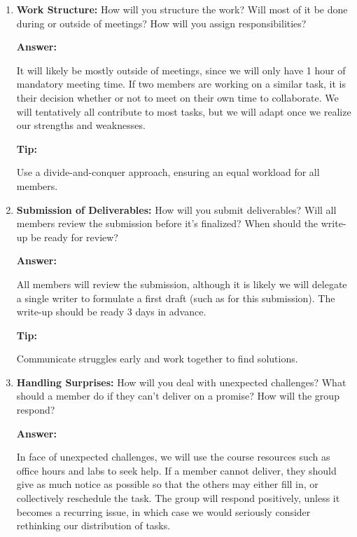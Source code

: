 \documentclass[12pt]{article}
\newenvironment{answer}[1][]{
  \color{blue}\textbf{Answer:}
}{}
\newenvironment{alice}[1][]{
  \color{black}\textbf{Tip:}
}{}
\begin{document}
\begin{enumerate}
\begin{alice}

Structure meetings effectively and decide on a method for resolving disagreements, such as consensus or majority vote.
\end{alice}

\item {\bf Work Structure:} How will you structure the work? Will most of it be done during or outside of meetings? How will you assign responsibilities?

\begin{answer}
  It will likely be mostly outside of meetings, since we will only have 1 hour of mandatory meeting time. If two members are working on a similar task, it is their decision whether or not to meet on their own time to collaborate. We will tentatively all contribute to most tasks, but we will adapt once we realize our strengths and weaknesses.
\end{answer}

\begin{alice}

Use a divide-and-conquer approach, ensuring an equal workload for all members.
\end{alice}

\item {\bf Submission of Deliverables:} How will you submit deliverables? Will all members review the submission before it’s finalized? When should the write-up be ready for review?

\begin{answer}

All members will review the submission, although it is likely we will delegate a single writer to formulate a first draft (such as for this submission). The write-up should be ready 3 days in advance.
\end{answer}

\begin{alice}

Communicate struggles early and work together to find solutions.
\end{alice}

\item {\bf Handling Surprises:} How will you deal with unexpected challenges? What should a member do if they can’t deliver on a promise? How will the group respond?

\begin{answer}
  In face of unexpected challenges, we will use the course resources such as office hours and labs to seek help. If a member cannot deliver, they should give as much notice as possible so that the others may either fill in, or collectively reschedule the task. The group will respond positively, unless it becomes a recurring issue, in which case we would seriously consider rethinking our distribution of tasks.
\end{answer}


\end{enumerate}
\end{document}
